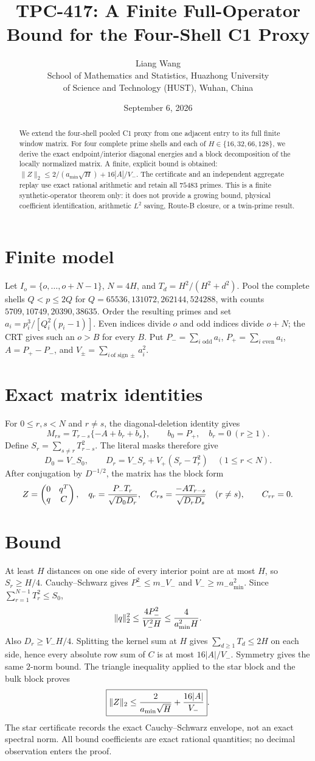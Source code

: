 \documentclass[11pt]{article}
\title{TPC-417: A Finite Full-Operator Bound for the Four-Shell C1 Proxy}
\author{Liang Wang\\School of Mathematics and Statistics, Huazhong University\\of Science and Technology (HUST), Wuhan, China}
\date{September 6, 2026}
\begin{document}
\maketitle
\begin{abstract}
We extend the four-shell pooled C1 proxy from one adjacent entry to its full
finite window matrix.  For four complete prime shells and each of
$H\in\{16,32,66,128\}$, we derive the exact endpoint/interior diagonal
energies and a block decomposition of the locally normalized matrix.  A
finite, explicit bound is obtained:
$\|Z\|_2\le 2/(a_{\min}\sqrt H)+16|A|/V_-$.  The certificate and an
independent aggregate replay use exact rational arithmetic and retain all
$75483$ primes.  This is a finite synthetic-operator theorem only: it does
not provide a growing bound, physical coefficient identification, arithmetic
$L^2$ saving, Route-B closure, or a twin-prime result.
\end{abstract}
\section{Finite model}
Let $I_o=\{o,\ldots,o+N-1\}$, $N=4H$, and
$T_d=H^2/(H^2+d^2)$.  Pool the complete shells
$Q<p\le2Q$ for $Q=65536,131072,262144,524288$, with counts
$5709,10749,20390,38635$.  Order the resulting primes and set
$a_i=p_i^3/[Q_i^2(p_i-1)]$.  Even indices divide $o$ and odd indices divide
$o+N$; the CRT gives such an $o>B$ for every $B$.  Put
$P_-=\sum_{i\text{ odd}}a_i$, $P_+=\sum_{i\text{ even}}a_i$,
$A=P_+-P_-$, and $V_\pm=\sum_{i\,\text{of sign}\,\pm}a_i^2$.
\section{Exact matrix identities}
For $0\le r,s<N$ and $r\ne s$, the diagonal-deletion identity gives
\[
 M_{rs}=T_{r-s}\{-A+b_r+b_s\},
\qquad b_0=P_+,\quad b_r=0\ (r\ge1).
\]
Define $S_r=\sum_{s\ne r}T_{r-s}^2$.  The literal masks therefore give
\[
 D_0=V_-S_0,\qquad D_r=V_-S_r+V_+(S_r-T_r^2)\quad(1\le r<N).
\]
After conjugation by $D^{-1/2}$, the matrix has the block form
\[
 Z=\begin{pmatrix}0&q^T\\q&C\end{pmatrix},\quad
 q_r={P_-T_r\over\sqrt{D_0D_r}},\quad
 C_{rs}={-AT_{r-s}\over\sqrt{D_rD_s}}\quad(r\ne s),\qquad C_{rr}=0.
\]
\section{Bound}
At least $H$ distances on one side of every interior point are at most $H$,
so $S_r\ge H/4$.  Cauchy--Schwarz gives $P_-^2\le m_-V_-$ and
$V_-\ge m_-a_{\min}^2$.  Since $\sum_{r=1}^{N-1}T_r^2\le S_0$,
\[
 \|q\|_2^2\le {4P_-^2\over V_-^2H}\le {4\over a_{\min}^2H}.
\]
Also $D_r\ge V_-H/4$.  Splitting the kernel sum at $H$ gives
$\sum_{d\ge1}T_d\le2H$ on each side, hence every absolute row sum of
$C$ is at most $16|A|/V_-$.  Symmetry gives the same $2$-norm bound.
The triangle inequality applied to the star block and the bulk block proves
\[
 \boxed{\|Z\|_2\le {2\over a_{\min}\sqrt H}+{16|A|\over V_-}}.
\]
The star certificate records the exact Cauchy--Schwarz envelope, not an exact
spectral norm.  All bound coefficients are exact rational quantities; no
decimal observation enters the proof.
\end{document}
